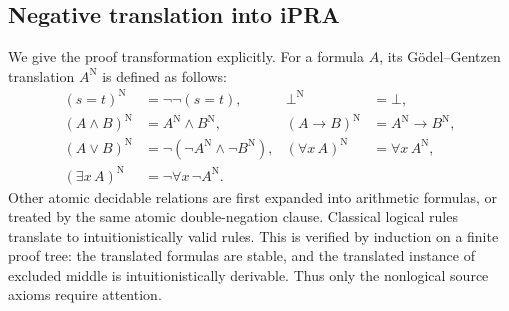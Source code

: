 \subsection{Negative translation into iPRA}

We give the proof transformation explicitly. For a formula $A$, its
G\"odel--Gentzen translation $A^{\mathrm N}$ is defined as follows:
\begin{align*}
 (s=t)^{\mathrm N}&=\neg\neg(s=t),&
 \bot^{\mathrm N}&=\bot,\\
 (A\land B)^{\mathrm N}&=A^{\mathrm N}\land B^{\mathrm N},&
 (A\to B)^{\mathrm N}&=A^{\mathrm N}\to B^{\mathrm N},\\
 (A\lor B)^{\mathrm N}&=\neg(\neg A^{\mathrm N}\land\neg B^{\mathrm N}),&
 (\forall x\,A)^{\mathrm N}&=\forall x\,A^{\mathrm N},\\
 (\exists x\,A)^{\mathrm N}&=\neg\forall x\,\neg A^{\mathrm N}.&&
\end{align*}
Other atomic decidable relations are first expanded into arithmetic
formulas, or treated by the same atomic double-negation clause.
Classical logical rules translate to intuitionistically valid rules. This
is verified by induction on a finite proof tree: the translated formulas
are stable, and the translated instance of excluded middle is
intuitionistically derivable. Thus only the nonlogical source axioms
require attention.

